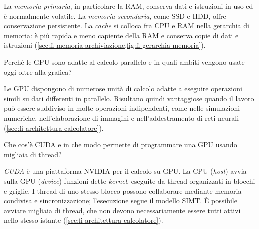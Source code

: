 La \emph{memoria primaria}, in particolare la RAM, conserva dati e
istruzioni in uso ed è normalmente volatile. La \emph{memoria
secondaria}, come SSD e HDD, offre conservazione persistente.
La \emph{cache} si colloca fra CPU e RAM nella gerarchia di memoria:
è più rapida e meno capiente della RAM e conserva copie di dati e
istruzioni (\cref{sec:fi-memoria-archiviazione,fig:fi-gerarchia-memoria}).

\begin{exercise}
\label{ex:fi-intro-gpu-parallelismo}
Perché le GPU sono adatte al calcolo parallelo e in quali ambiti
vengono usate oggi oltre alla grafica?
\end{exercise}

Le GPU dispongono di numerose unità di calcolo adatte a eseguire
operazioni simili su dati differenti in parallelo. Risultano quindi
vantaggiose quando il lavoro può essere suddiviso in molte operazioni
indipendenti, come nelle simulazioni numeriche, nell'elaborazione di
immagini e nell'addestramento di reti neurali
(\cref{sec:fi-architettura-calcolatore}).

\begin{exercise}
\label{ex:fi-intro-cuda-thread}
Che cos'è CUDA e in che modo permette di programmare una GPU usando
migliaia di thread?
\end{exercise}

\emph{CUDA} è una piattaforma NVIDIA per il calcolo su GPU. La CPU
(\emph{host}) avvia sulla GPU (\emph{device}) funzioni dette
\emph{kernel}, eseguite da thread organizzati in blocchi e griglie.
I thread di uno stesso blocco possono collaborare mediante memoria
condivisa e sincronizzazione; l'esecuzione segue il modello SIMT.
È possibile avviare migliaia di thread, che non devono necessariamente
essere tutti attivi nello stesso istante
(\cref{sec:fi-architettura-calcolatore}).
